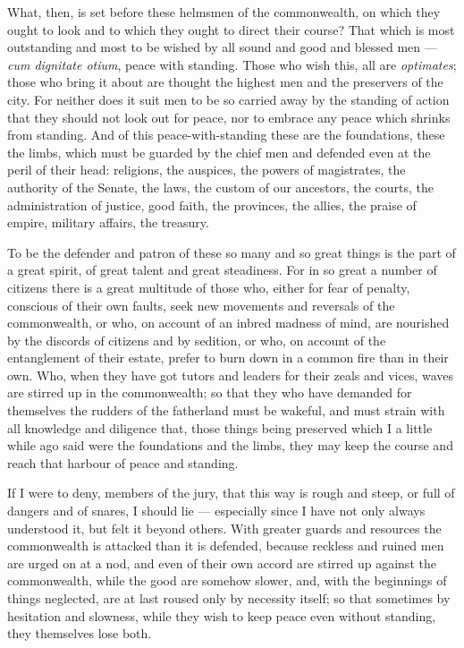  What, then, is set before these helmsmen of the commonwealth, on which they ought to look and to which they ought to direct their course? That which is most outstanding and most to be wished by all sound and good and blessed men --- \textit{cum dignitate otium}, peace with standing. Those who wish this, all are \textit{optimates}; those who bring it about are thought the highest men and the preservers of the city. For neither does it suit men to be so carried away by the standing of action that they should not look out for peace, nor to embrace any peace which shrinks from standing. And of this peace-with-standing these are the foundations, these the limbs, which must be guarded by the chief men and defended even at the peril of their head: religions, the auspices, the powers of magistrates, the authority of the Senate, the laws, the custom of our ancestors, the courts, the administration of justice, good faith, the provinces, the allies, the praise of empire, military affairs, the treasury.

 To be the defender and patron of these so many and so great things is the part of a great spirit, of great talent and great steadiness. For in so great a number of citizens there is a great multitude of those who, either for fear of penalty, conscious of their own faults, seek new movements and reversals of the commonwealth, or who, on account of an inbred madness of mind, are nourished by the discords of citizens and by sedition, or who, on account of the entanglement of their estate, prefer to burn down in a common fire than in their own. Who, when they have got tutors and leaders for their zeals and vices, waves are stirred up in the commonwealth; so that they who have demanded for themselves the rudders of the fatherland must be wakeful, and must strain with all knowledge and diligence that, those things being preserved which I a little while ago said were the foundations and the limbs, they may keep the course and reach that harbour of peace and standing.

 If I were to deny, members of the jury, that this way is rough and steep, or full of dangers and of snares, I should lie --- especially since I have not only always understood it, but felt it beyond others. With greater guards and resources the commonwealth is attacked than it is defended, because reckless and ruined men are urged on at a nod, and even of their own accord are stirred up against the commonwealth, while the good are somehow slower, and, with the beginnings of things neglected, are at last roused only by necessity itself; so that sometimes by hesitation and slowness, while they wish to keep peace even without standing, they themselves lose both.

